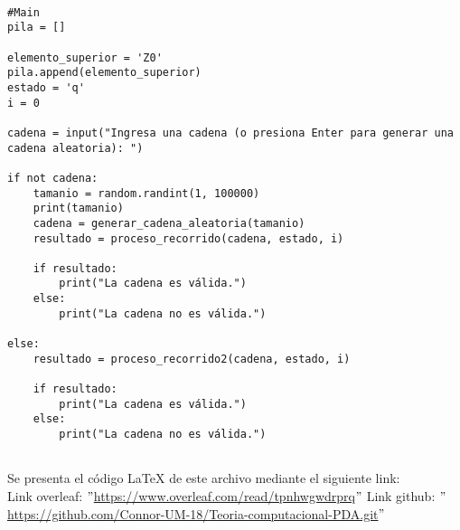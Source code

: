 \begin{lstlisting}
    
#Main
pila = []

elemento_superior = 'Z0'
pila.append(elemento_superior)
estado = 'q'
i = 0

cadena = input("Ingresa una cadena (o presiona Enter para generar una cadena aleatoria): ")

if not cadena:
    tamanio = random.randint(1, 100000)
    print(tamanio)
    cadena = generar_cadena_aleatoria(tamanio)
    resultado = proceso_recorrido(cadena, estado, i)

    if resultado:
        print("La cadena es válida.")
    else:
        print("La cadena no es válida.")
    
else:
    resultado = proceso_recorrido2(cadena, estado, i)

    if resultado:
        print("La cadena es válida.")
    else:
        print("La cadena no es válida.")
    
\end{lstlisting}

Se presenta el código LaTeX de este archivo mediante el siguiente link:\newline
\\
Link overleaf: $"$\url{https://www.overleaf.com/read/tpnhwgwdrprq}$"$\newline
Link github: $"$\url{https://github.com/Connor-UM-18/Teoria-computacional-PDA.git}$"$\newline
